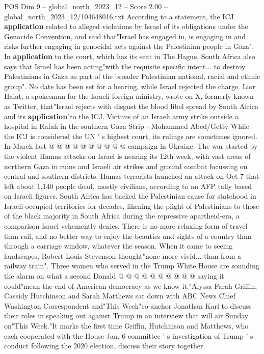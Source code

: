 \begin{textsample}{POS Dim 9 – global\_north\_2023\_12 – Score 2.00 – global\_north\_2023\_12/104648016.txt}  \label{ex:f9_pos_366}
According to a statement, the ICJ \textbf{application} related to alleged violations by Israel of its obligations under the Genocide Convention, and said that"Israel has engaged in, is engaging in and risks further engaging in genocidal acts against the Palestinian people in Gaza".
In \textbf{application} to the court, which has its seat in The Hague, South Africa also says that Israel has been acting"with the requisite specific intent... to destroy Palestinians in Gaza as part of the broader Palestinian national, racial and ethnic group".
No date has been set for a hearing, while Israel rejected the charge.
Lior Haiat, a spokesman for the Israeli foreign ministry, wrote on X, formerly known as Twitter, that"Israel rejects with disgust the blood libel spread by South Africa and its \textbf{application}"to the ICJ.
Victims of an Israeli army strike outside a hospital in Rafah in the southern Gaza Strip - Mohammed Abed/Getty While the ICJ is considered the UN ' s highest court, its rulings are sometimes ignored.
In March last @ @ @ @ @ @ @ @ @ @ campaign in Ukraine.
The war started by the violent Hamas attacks on Israel is nearing its 12th week, with vast areas of northern Gaza in ruins and Israeli air strikes and ground combat focussing on central and southern districts.
Hamas terrorists launched an attack on Oct 7 that left about 1,140 people dead, mostly civilians, according to an AFP tally based on Israeli figures.
South Africa has backed the Palestinian cause for statehood in Israeli-occupied territories for decades, likening the plight of Palestinians to those of the black majority in South Africa during the repressive apartheid-era, a comparison Israel vehemently denies.
There is no more relaxing form of travel than rail, and no better way to enjoy the beauties and sights of a country than through a carriage window, whatever the season.
When it came to seeing landscapes, Robert Louis Stevenson thought"none more vivid... than from a railway train".
Three women who served in the Trump White House are sounding the alarm on what a second Donald @ @ @ @ @ @ @ @ @ @ saying it could"mean the end of American democracy as we know it."Alyssa Farah Griffin, Cassidy Hutchinson and Sarah Matthews sat down with ABC News Chief Washington Correspondent and"This Week"co-anchor Jonathan Karl to discuss their roles in speaking out against Trump in an interview that will air Sunday on"This Week."It marks the first time Griffin, Hutchinson and Matthews, who each cooperated with the House Jan. 6 committee ' s investigation of Trump ' s conduct following the 2020 election, discuss their story together.

\end{textsample}
